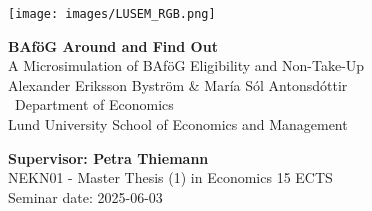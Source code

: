 
\sloppy  %

\texttt{[image: images/LUSEM\_RGB.png]} %

\vspace{2cm}
\begin{center}       
    \vspace*{2cm}
    {\LARGE \textbf{BAföG Around and Find Out} \\ 
     \large A Microsimulation of BAföG Eligibility and Non-Take-Up} \\
    \vspace{1cm}
    Alexander Eriksson Byström \& María Sól Antonsdóttir \\[0.3cm]
    \ \normalsize  Department of Economics \\ 
    Lund University School of Economics and Management
\end{center}
\vspace{2cm}

\vfill
\noindent 
\textbf{Supervisor: Petra Thiemann} \\ 
NEKN01 - Master Thesis (1) in Economics 15 ECTS \\ 
Seminar date: 2025-06-03
\thispagestyle{empty}

\fussy  %

\newpage





